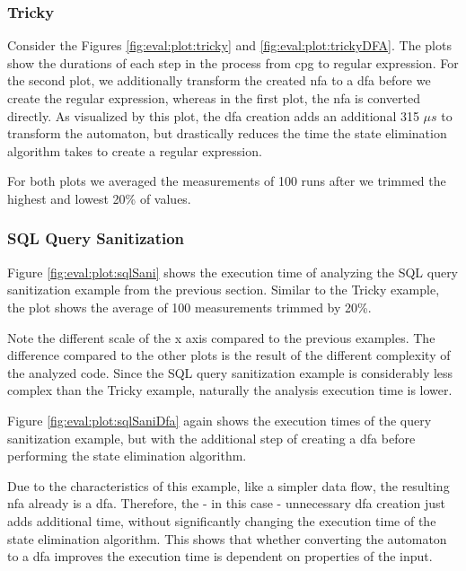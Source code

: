 \subsubsection{Tricky}

Consider the Figures \ref{fig:eval:plot:tricky} and \ref{fig:eval:plot:trickyDFA}. 
The plots show the durations of each step in the process from \ac{cpg} to regular expression. 
For the second plot, we additionally transform the created \ac{nfa} to a \ac{dfa} before we create the regular expression, whereas in the first plot, the \ac{nfa} is converted directly. As visualized by this plot, the \ac{dfa} creation adds an additional 315 $\mu s$ to transform the automaton, but drastically reduces the time the state elimination algorithm takes to create a regular expression.

For both plots we averaged the measurements of 100 runs after we trimmed the highest and lowest 20\% of values.

\subsubsection{SQL Query Sanitization}

Figure \ref{fig:eval:plot:sqlSani} shows the execution time of analyzing the SQL query sanitization example from the previous section. Similar to the Tricky example, the plot shows the average of 100 measurements trimmed by 20\%. 

Note the different scale of the x axis compared to the previous examples. The difference compared to the other plots is the result of the different complexity of the analyzed code. Since the SQL query sanitization example is considerably less complex than the Tricky example, naturally the analysis execution time is lower. 

Figure \ref{fig:eval:plot:sqlSaniDfa} again shows the execution times of the query sanitization example, but with the additional step of creating a \ac{dfa} before performing the state elimination algorithm.

Due to the characteristics of this example, like a simpler data flow, the resulting \ac{nfa} already is a \ac{dfa}. Therefore, the - in this case - unnecessary \ac{dfa} creation just adds additional time, without significantly changing the execution time of the state elimination algorithm. This shows that whether converting the automaton to a \ac{dfa} improves the execution time is dependent on properties of the input.

